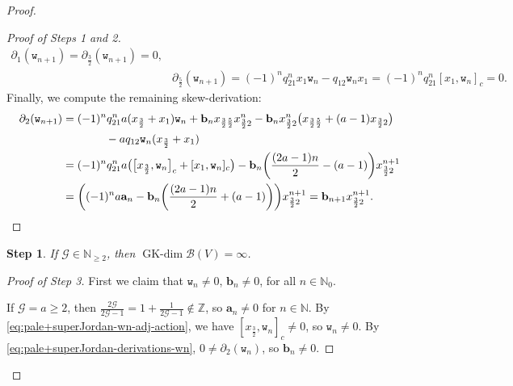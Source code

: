 \documentclass[pdftex]{sigma}
\numberwithin{equation}{section}
\newtheorem{stepv}{Step}
\newcommand{\GK}{\operatorname{GK-dim}}
\newcommand{\toba}{\mathscr B}
\newcommand{\ghost}{\mathscr{G}}
\newcommand{\ab}{\mathbf a}
\newcommand{\bb}{\mathbf b}
\newcommand{\N}{{\mathbb N}}
\newcommand{\Z}{{\mathbb Z}}
\newcommand{\wt}{\mathtt{w}}
\newcommand{\tresdos}{\frac{3}{2}}
\newcommand{\cincodos}{\frac{5}{2}}
\begin{document}
\begin{proof}
\begin{proof}[Proof of Steps 1 and 2]
\begin{align*}
\partial_1 (\wt_{n+1})=\partial_{\tresdos}(\wt_{n+1})=0,
\\
&\partial_{\cincodos} (\wt_{n+1})
= (-1)^{n} q_{21}^{n}x_1 \wt_n -q_{12}\wt_n x_1
= (-1)^{n} q_{21}^{n} [x_1, \wt_n]_c=0.
\end{align*}
Finally, we compute the remaining skew-derivation:
\begin{align*}
\partial_{2} (\wt_{n+1})
&= (-1)^{n} q_{21}^{n}a(x_{\tresdos}+x_1) \wt_n+\bb_n x_{\tresdos\cincodos}x_{\tresdos2}^{n}
-\bb_n x_{\tresdos2}^{n} \big(x_{\tresdos\cincodos}+(a-1)x_{\tresdos2}\big)
\\ &\hphantom{\partial_{2} (\wt_{n+1})}
-aq_{12}\wt_n (x_{\tresdos}+x_1)
\\
&= (-1)^{n} q_{21}^{n}a \big(\big[x_{\tresdos},\wt_n\big]_c + [x_{1},\wt_n]_c\big)
-\bb_n \bigg(\frac{(2a-1)n}{2}-(a-1)\bigg)x_{\tresdos2}^{n+1}
\\
&= \bigg((-1)^{n} a \ab_n -\bb_n \bigg(\frac{(2a-1)n}{2}+(a-1)\bigg)\bigg) x_{\tresdos2}^{n+1}
= \bb_{n+1} x_{\tresdos2}^{n+1}. \tag*{\qed}
\end{align*}
\renewcommand{\qed}{}
\end{proof}

\begin{stepv}%
If $\ghost\in\N_{\ge 2}$, then $\GK \toba(V)=\infty$.
\end{stepv}

\begin{proof}[Proof of Step 3]
First we claim that $\wt_n \ne 0$, $\bb_n \ne 0$, for all $n\in\N_0$.

If $\ghost=a\ge 2$, then $\tfrac{2\ghost}{2\ghost-1}=1+\tfrac{1}{2\ghost-1}\notin\Z$, so $\ab_n\ne 0$ for $n\in\N$.
By \eqref{eq:pale+superJordan-wn-adj-action}, we have $[x_{\tresdos},\wt_n]_c\ne 0$, so $\wt_n \ne 0$.
By \eqref{eq:pale+superJordan-derivations-wn}, $0\ne \partial_2(\wt_n)$, so $\bb_{n}\ne 0$.


\end{proof}
\end{proof}
\end{document}
